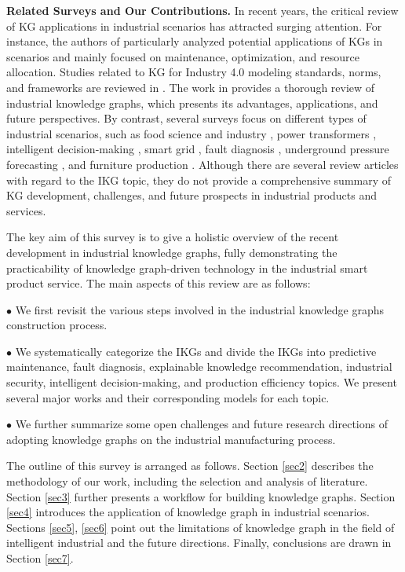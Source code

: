 \documentclass[11pt]{article}
\begin{document}
\par{\textbf{Related Surveys and Our Contributions.}
In recent years, the critical review of KG applications in industrial scenarios has attracted surging attention.
For instance, the authors of \cite{bib4} particularly analyzed potential applications of KGs in scenarios and mainly focused on maintenance, optimization, and resource allocation.
Studies related to KG for Industry 4.0 modeling standards, norms, and frameworks are reviewed in \cite{bib5}.
The work in \cite{bib6} provides a thorough review of industrial knowledge graphs, which presents its advantages, applications, and future perspectives.
By contrast, several surveys focus on different types of industrial scenarios, such as food science and industry \cite{bib7}, power transformers \cite{bib8}, intelligent decision-making \cite{bib9}, smart grid \cite{bib10}, fault diagnosis \cite{bib11}, underground pressure forecasting \cite{bibfo}, and furniture production \cite{bib12}.
Although there are several review articles with regard to the IKG topic, they do not provide a comprehensive summary of KG development, challenges, and future prospects in industrial products and services. }

\par{The key aim of this survey is to give a holistic overview of the recent development in industrial knowledge graphs, fully demonstrating the practicability of knowledge graph-driven technology in the industrial smart product service.
The main aspects of this review are as follows:}

\par{$\bullet$ We first revisit the various steps involved in the industrial knowledge graphs construction process.}

\par{$\bullet$ We systematically categorize the IKGs and divide the IKGs into predictive maintenance, fault diagnosis, explainable knowledge recommendation, industrial security, intelligent decision-making, and production efficiency topics.
We present several major works and their corresponding models for each topic.}

\par{$\bullet$ We further summarize some open challenges and future research directions of adopting knowledge graphs on the industrial manufacturing process.}


\par{The outline of this survey is arranged as follows.
Section \ref{sec2} describes the methodology of our work, including the selection and analysis of literature.
Section \ref{sec3} further presents a workflow for building knowledge graphs.
Section \ref{sec4} introduces the application of knowledge graph in industrial scenarios.
Sections \ref{sec5}, \ref{sec6} point out the limitations of knowledge graph in the field of intelligent industrial and the future directions.
Finally, conclusions are drawn in Section \ref{sec7}.}
\end{document}
